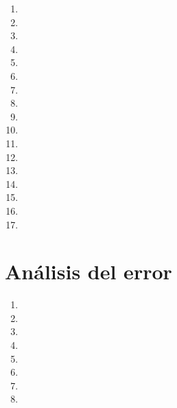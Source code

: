 \documentclass[a4paper,11pt]{article}
\theoremstyle{teoremas}
\theoremstyle{ejemplos}
\theoremstyle{definiciones}
\theoremstyle{lemas}
\begin{document}
\begin{enumerate}
 \item 
 \item 
 \item 
 \item 
 \item 
 \item 
 \item 
 \item 
 \item 
 \item 
 \item 
 \item 
 \item 
 \item 
 \item 
 \item 
 \item 
\end{enumerate}

\newpage

\section{An\'alisis del error}

\begin{enumerate}
 \item 
 \item 
 \item 
 \item 
 \item 
 \item 
 \item 
 \item 
\end{enumerate}
\end{document}
